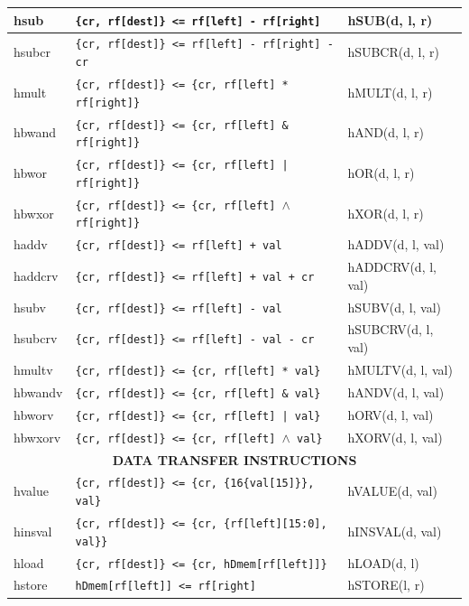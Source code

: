 \begin{table}[H]
\begin{longtable}{|l|l|l|}
hsub   & \texttt{\{cr, rf[dest]\} <= rf[left] - rf[right]}            & hSUB(d, l, r) \\ \hline
hsubcr & \texttt{\{cr, rf[dest]\} <= rf[left] - rf[right] - cr}       & hSUBCR(d, l, r) \\ \hline
hmult  & \texttt{\{cr, rf[dest]\} <= \{cr, rf[left] * rf[right]\}}    & hMULT(d, l, r) \\ \hline
hbwand & \texttt{\{cr, rf[dest]\} <= \{cr, rf[left] \& rf[right]\}}   & hAND(d, l, r) \\ \hline
hbwor  & \texttt{\{cr, rf[dest]\} <= \{cr, rf[left] | rf[right]\}}    & hOR(d, l, r)  \\ \hline
hbwxor & \texttt{\{cr, rf[dest]\} <= \{cr, rf[left] $\wedge$ rf[right]\}} & hXOR(d, l, r) \\ \hline
haddv  & \texttt{\{cr, rf[dest]\} <= rf[left] + val}                  & hADDV(d, l, val) \\ \hline
haddcrv & \texttt{\{cr, rf[dest]\} <= rf[left] + val + cr}            & hADDCRV(d, l, val) \\ \hline
hsubv  & \texttt{\{cr, rf[dest]\} <= rf[left] - val}                  & hSUBV(d, l, val) \\ \hline
hsubcrv & \texttt{\{cr, rf[dest]\} <= rf[left] - val - cr}            & hSUBCRV(d, l, val) \\ \hline
hmultv & \texttt{\{cr, rf[dest]\} <= \{cr, rf[left] * val\}}          & hMULTV(d, l, val) \\ \hline
hbwandv & \texttt{\{cr, rf[dest]\} <= \{cr, rf[left] \& val\}}        & hANDV(d, l, val) \\ \hline
hbworv & \texttt{\{cr, rf[dest]\} <= \{cr, rf[left] | val\}}          & hORV(d, l, val) \\ \hline
hbwxorv & \texttt{\{cr, rf[dest]\} <= \{cr, rf[left] $\wedge$ val\}}  & hXORV(d, l, val) \\ \hline
\multicolumn{3}{|c|}{\textbf{DATA TRANSFER INSTRUCTIONS}} \\
\hline
hvalue  & \texttt{\{cr, rf[dest]\} <= \{cr, \{16\{val[15]\}\}, val\}} & hVALUE(d, val) \\ \hline
hinsval & \texttt{\{cr, rf[dest]\} <= \{cr, \{rf[left][15:0], val\}\}} & hINSVAL(d, val) \\ \hline
hload   & \texttt{\{cr, rf[dest]\} <= \{cr, hDmem[rf[left]]\}}        & hLOAD(d, l)    \\ \hline
hstore  & \texttt{hDmem[rf[left]] <= rf[right]}                       & hSTORE(l, r)   \\ \hline
\end{longtable}
\end{table}





